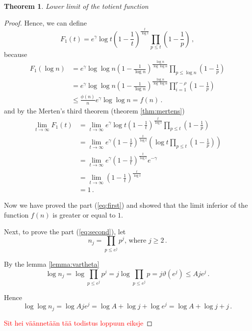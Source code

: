 \documentclass{article}
\theoremstyle{definition}
\newtheorem{theorem}[subsubsection]{Theorem}
\begin{document}
\begin{theorem}{\emph{Lower limit of the totient function}}
\begin{proof}
Hence, we can define
\begin{equation*}
    F_1(t)=e^\gamma \log t \left(1-\frac{1}{t}\right)^\frac{t}{\log t} \prod_{p\leq t} \left(1-\frac{1}{p}\right)\,,
\end{equation*}
because
\begin{align*}
    F_1(\log n) & = e^\gamma \log \log n \left(1-\frac{1}{\log n}\right)^\frac{\log n}{\log \log n} \prod_{p\leq \log n} \left(1-\frac{1}{p}\right)\\
    & = e^\gamma \log \log n \left(1-\frac{1}{\log n}\right)^\frac{\log n}{\log \log n} \prod_{i=1}^{r-\rho} \left(1-\frac{1}{p}\right)\\
    & \leq \frac{\phi(n)}{n} e^\gamma \log\log n = f(n)\,.
\end{align*}
and by the Merten's third theorem (theorem \ref{thm:mertens})
\begin{align*}
    \lim_{t \rightarrow \infty} F_1(t) & = \lim_{t \rightarrow \infty} e^\gamma \log t \left(1-\frac{1}{t}\right)^\frac{t}{\log t} \prod_{p\leq t} \left(1-\frac{1}{p}\right)\\
    & = \lim_{t \rightarrow \infty} e^\gamma \left( 1-\frac{1}{t}\right)^\frac{t}{\log t} \left(\log t \prod_{p\leq t} \left(1-\frac{1}{p}\right) \right)\\
    & = \lim_{t \rightarrow \infty} e^\gamma \left( 1-\frac{1}{t}\right)^\frac{t}{\log t} e^{-\gamma}\\
    & = \lim_{t \rightarrow \infty} \left( 1-\frac{1}{t}\right)^\frac{t}{\log t}\\
    & = 1\,.
\end{align*}

Now we have proved the part (\ref{eq:first}) and showed that the limit inferior of the function $f(n)$ is greater or equal to $1$.

Next, to prove the part (\ref{eq:second}), let
\begin{equation*}
    n_j=\prod_{p\leq e^j} p^j\text{, where } j\geq 2\,.
\end{equation*}

By the lemma \ref{lemma:vartheta}
\begin{equation*}
    \log n_j = \log \prod_{p\leq e^j} p^j = j \log \prod_{p\leq e^j} p = j\vartheta(e^j) \leq Aje^j\,.
\end{equation*}

Hence
\begin{equation*}
    \log \log n_j = \log Aje^j = \log A + \log j + \log e^j = \log A + \log j + j\,.
\end{equation*}

\textcolor{red}{Sit hei väännetään tää todistus loppuun eiksje}

\end{proof}

\end{theorem}
\end{document}
